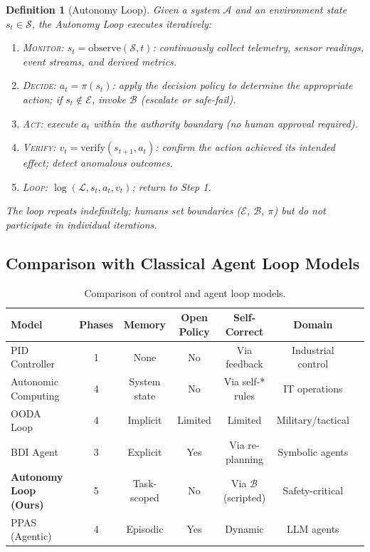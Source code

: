 \documentclass[12pt, a4paper]{article}
\newtheorem{definition}{Definition}
\begin{document}
\begin{definition}[Autonomy Loop]
Given a system $\mathcal{A}$ and an environment state $s_t \in \mathcal{S}$, the Autonomy Loop executes iteratively:
\begin{enumerate}
    \item \textsc{Monitor}: $s_t = \text{observe}(\mathcal{S}, t)$: continuously collect telemetry, sensor readings, event streams, and derived metrics.
    \item \textsc{Decide}: $a_t = \pi(s_t)$: apply the decision policy to determine the appropriate action; if $s_t \notin \mathcal{E}$, invoke $\mathcal{B}$ (escalate or safe-fail).
    \item \textsc{Act}: execute $a_t$ within the authority boundary (no human approval required).
    \item \textsc{Verify}: $v_t = \text{verify}(s_{t+1}, a_t)$: confirm the action achieved its intended effect; detect anomalous outcomes.
    \item \textsc{Loop}: $\log(\mathcal{L}, s_t, a_t, v_t)$; return to Step 1.
\end{enumerate}
The loop repeats indefinitely; humans set boundaries ($\mathcal{E}$, $\mathcal{B}$, $\pi$) but do not participate in individual iterations.
\end{definition}

\subsection{Comparison with Classical Agent Loop Models}

\begin{table}[ht]
\centering
\caption{Comparison of control and agent loop models.}
\label{tab:loop-comparison}
\begin{tabular}{lcccccc}
\toprule
\textbf{Model} & \textbf{Phases} & \textbf{Memory} & \textbf{Open Policy} & \textbf{Self-Correct} & \textbf{Domain} \\
\midrule
PID Controller~\citep{astrom2006pid}         & 1 & None      & No  & Via feedback & Industrial control \\
Autonomic Computing~\citep{kephart2003autonomic} & 4 & System state & No & Via self-* rules & IT operations \\
OODA Loop~\citep{boyd1987ooda}               & 4 & Implicit  & Limited & Limited & Military/tactical \\
BDI Agent~\citep{rao1995bdi}                 & 3 & Explicit  & Yes & Via re-planning & Symbolic agents \\
\textbf{Autonomy Loop (Ours)}                & 5 & Task-scoped & No & Via $\mathcal{B}$ (scripted) & Safety-critical \\
PPAS (Agentic)~\citep{mahdi2026agentic}      & 4 & Episodic  & Yes & Dynamic & LLM agents \\
\bottomrule
\end{tabular}
\end{table}
\end{document}
